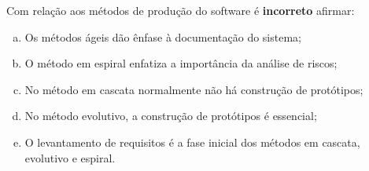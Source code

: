 \quiz Com relação aos métodos de produção do software é {\bf incorreto} afirmar:

\begin{enumerate}[a)]
\item Os métodos ágeis dão ênfase à documentação do sistema;
\item O método em espiral enfatiza a importância da análise de riscos;
\item No método em cascata normalmente não há construção de protótipos;
\item No método evolutivo, a construção de protótipos é essencial;
\item O levantamento de requisitos é a fase inicial dos métodos em
  cascata, evolutivo e espiral.
\end{enumerate}


